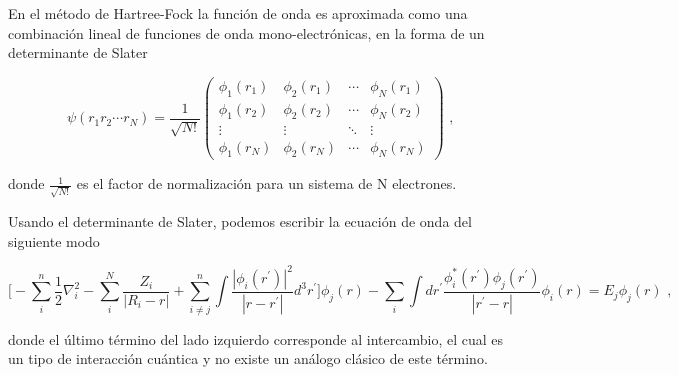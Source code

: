 En el m\'etodo de Hartree-Fock la funci\'on de onda es aproximada como una 
combinaci\'on lineal de funciones de onda mono-electr\'onicas, en la forma de 
un determinante de Slater

\begin{equation}
\psi (r_{1}r_{2}\cdots r_{N}) = \frac{1}{\sqrt{N!}} 
\left ( 
\begin{array}{cccc}
\phi _{1}(r_{1}) & \phi _{2}(r_{1}) & \cdots & \phi _{N}(r_{1}) \\
\phi _{1}(r_{2}) & \phi _{2}(r_{2}) & \cdots & \phi _{N}(r_{2}) \\
\vdots & \vdots & \ddots & \vdots \\
\phi _{1}(r_{N}) & \phi _{2}(r_{N}) & \cdots & \phi _{N}(r_{N})
\end{array} 
\right ) \textrm{ ,}
\end{equation}

\noindent donde $\frac{1}{\sqrt{N!}}$ es el factor de normalizaci\'on para un 
sistema de 
N electrones.

\noindent Usando el determinante de Slater, podemos escribir la ecuaci\'on de 
onda del 
siguiente modo


\begin{equation}
\big [ - \sum _{i}^{n} \frac{1}{2} \nabla _{i}^{2} - \sum _{i} ^{N} 
\frac{Z_{i}}{|R_{i}-r|} + \sum _{i \ne j} ^{n} \int \frac{|\phi 
    _{i}(r^{\prime})|^{2}}{|r-r^{\prime }|}d^{3}r^{\prime} \big] \phi _{j} (r) 
- 
\sum _{i} \int dr^{\prime} \frac{\phi _{i}^{*}(r^{\prime}) \phi 
    _{j}(r^{\prime})}{|r^{\prime}-r|} \phi_{i}(r) = E_{j} \phi _{j}(r) \textrm{ 
    ,}
\end{equation}

\noindent donde el \'ultimo t\'ermino del lado izquierdo corresponde al 
intercambio, el 
cual es un tipo de interacci\'on cu\'antica y no existe un an\'alogo cl\'asico 
de este t\'ermino.
